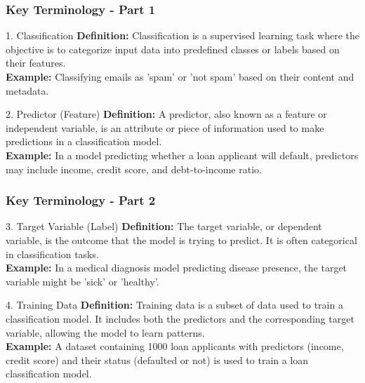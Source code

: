 \documentclass{beamer}
\begin{document}
\begin{frame}[fragile]
    \frametitle{Key Terminology - Part 1}
    \begin{block}{1. Classification}
        \textbf{Definition:} Classification is a supervised learning task where the objective is to categorize input data into predefined classes or labels based on their features. \\
        \textbf{Example:} Classifying emails as 'spam' or 'not spam' based on their content and metadata.
    \end{block}
    
    \begin{block}{2. Predictor (Feature)}
        \textbf{Definition:} A predictor, also known as a feature or independent variable, is an attribute or piece of information used to make predictions in a classification model. \\
        \textbf{Example:} In a model predicting whether a loan applicant will default, predictors may include income, credit score, and debt-to-income ratio.
    \end{block}
\end{frame}

\begin{frame}[fragile]
    \frametitle{Key Terminology - Part 2}
    \begin{block}{3. Target Variable (Label)}
        \textbf{Definition:} The target variable, or dependent variable, is the outcome that the model is trying to predict. It is often categorical in classification tasks. \\
        \textbf{Example:} In a medical diagnosis model predicting disease presence, the target variable might be 'sick' or 'healthy'.
    \end{block}
    
    \begin{block}{4. Training Data}
        \textbf{Definition:} Training data is a subset of data used to train a classification model. It includes both the predictors and the corresponding target variable, allowing the model to learn patterns. \\
        \textbf{Example:} A dataset containing 1000 loan applicants with predictors (income, credit score) and their status (defaulted or not) is used to train a loan classification model.
    \end{block}
\end{frame}
\end{document}
